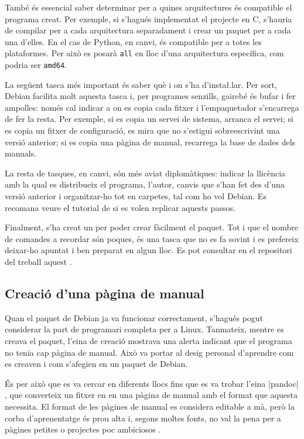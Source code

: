 També és essencial saber determinar per a quines arquitectures és compatible el
programa creat. Per exemple, si s'hagués implementat el projecte en C, s'hauria
de compilar per a cada arquitectura separadament i crear un paquet per a cada
una d'elles. En el cas de Python, en canvi, és compatible per a totes les
plataformes. Per això es posarà \texttt{all} en lloc d'una arquitectura específica,
com podria ser \texttt{amd64}.

La següent tasca més important és saber què i on s'ha d'insta\l.lar. Per sort,
Debian facilita molt aquesta tasca i, per programes senzills, gairebé és
bufar i fer ampolles: només cal indicar a on es copia cada fitxer i l'empaquetador
s'encarrega de fer la resta. Per exemple, si es copia un servei de sistema,
arranca el servei; si es copia un fitxer de configuració, es mira
que no s'estigui sobreescrivint una versió anterior; si es copia una pàgina de
manual, recarrega la base de dades dels manuals.

La resta de tasques, en canvi, són més aviat diplomàtiques: indicar la llicència
amb la qual es distribueix el programa, l'autor, canvis que s'han fet des d'una
versió anterior i organitzar-ho tot en carpetes, tal com ho vol Debian.
Es recomana veure el tutorial de \cite{DebCreation} si es volen replicar aquests
passos.

Finalment, s'ha creat un  per poder crear fàcilment el
paquet. Tot i que el nombre de comandes a recordar són poques, és una tasca que
no es fa sovint i es prefereix deixar-ho apuntat i ben preparat en algun lloc.
Es pot consultar en el repositori del treball aquest .

\subsection{Creació d'una pàgina de manual}

Quan el paquet de Debian ja va funcionar correctament, s'hagués pogut considerar
la part de programari completa per a Linux. Tanmateix, mentre es creava el paquet,
l'eina de creació mostrava una alerta indicant que el programa no tenia cap
pàgina de manual. Això va portar al desig personal d'aprendre com es creaven
i com s'afegien en un paquet de Debian.

És per això que es va cercar en diferents llocs fins que es va trobar l'eina
\ord|pandoc| \cite{PandocTutorial},
que converteix un fitxer en  en una pàgina de manual amb el
format que aquesta necessita. El format de les pàgines de manual es considera
editable a mà, però la corba d'aprenentatge és prou alta i, segons moltes fonts,
no val la pena per a pàgines petites o projectes poc ambiciosos \cite{Manpage}.

